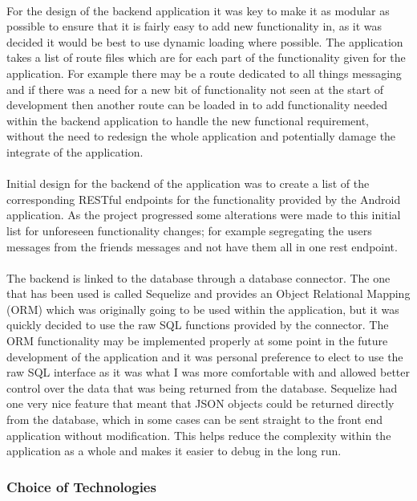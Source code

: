 \\
For the design of the backend application it was key to make it as modular as possible to ensure that it is fairly easy to add new functionality in, as it was decided it would be best to use dynamic loading where possible. The application takes a list of route files which are for each part of the functionality given for the application. For example there may be a route dedicated to all things messaging and if there was a need for a new bit of functionality not seen at the start of development then another route can be loaded in to add functionality needed within the backend application to handle the new functional requirement, without the need to redesign the whole application and potentially damage the integrate of the application.\\
\\
Initial design for the backend of the application was to create a list of the corresponding RESTful endpoints for the functionality provided by the Android application. As the project progressed some alterations were made to this initial list for unforeseen functionality changes; for example segregating the users messages from the friends messages and not have them all in one rest endpoint.\\
\\
The backend is linked to the database through a database connector. The one that has been used is called Sequelize \cite{SaschaDepold:Sequelize:2015:online} and provides an Object Relational Mapping (ORM) which was originally going to be used within the application, but it was quickly decided to use the raw SQL functions provided by the connector. The ORM functionality may be implemented properly at some point in the future development of the application and it was personal preference to elect to use the raw SQL interface as it was what I was more comfortable with and allowed better control over the data that was being returned from the database. Sequelize had one very nice feature that meant that JSON objects could be returned directly from the database, which in some cases can be sent straight to the front end application without modification. This helps reduce the complexity within the application as a whole and makes it easier to debug in the long run.

\subsubsection{Choice of Technologies}
\label{sec:node_choice_of_tech}

